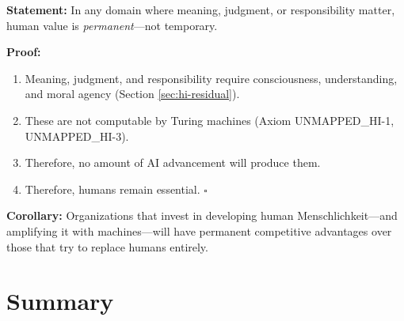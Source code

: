 \begin{tcolorbox}[colback=green!5!white, colframe=green!75!black,
    title=\textbf{Theorem AF-3: The Permanent Value of Humans}]
\textbf{Statement:} In any domain where meaning, judgment, or responsibility matter, human value is \textit{permanent}---not temporary.

\textbf{Proof:}
\begin{enumerate}
    \item Meaning, judgment, and responsibility require consciousness, understanding, and moral agency (Section \ref{sec:hi-residual}).
    \item These are not computable by Turing machines (Axiom UNMAPPED_HI-1, UNMAPPED_HI-3).
    \item Therefore, no amount of AI advancement will produce them.
    \item Therefore, humans remain essential. \hfill $\square$
\end{enumerate}

\textbf{Corollary:} Organizations that invest in developing human Menschlichkeit---and amplifying it with machines---will have permanent competitive advantages over those that try to replace humans entirely.
\end{tcolorbox}


\section{Summary}
\label{sec:hi-summary}

